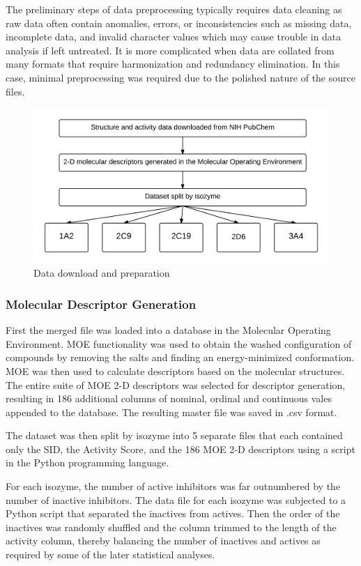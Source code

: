 The preliminary steps of data preprocessing typically requires data cleaning as raw data often contain anomalies, errors, or inconsistencies such as missing data, incomplete data, and invalid character values which may cause trouble in data analysis if left untreated. It is more complicated when data are collated from many formats that require harmonization and redundancy elimination. \cite{Nantasenamat2009} In this case, minimal preprocessing was required due to the polished nature of the source files.


\begin{figure}[h,t]
  \caption{Data download and preparation}
  \centering
   \includegraphics[width=1\textwidth]{../img/Dataset_prep.png}
\end{figure}


\subsubsection{Molecular Descriptor Generation}
First the merged file was loaded into a database in the Molecular Operating Environment. MOE functionality was used to obtain the washed configuration of compounds by removing the salts and finding an energy-minimized conformation. MOE was then used to calculate descriptors based on the molecular structures. The entire suite of MOE 2-D descriptors was selected for descriptor generation, resulting in 186 additional columns of nominal, ordinal and continuous vales appended to the database. The resulting master file was saved in .csv format.

The dataset was then split by isozyme into 5 separate files that each contained only the SID, the Activity Score, and the 186 MOE 2-D descriptors using a script in the Python programming language.

For each isozyme, the number of active inhibitors was far outnumbered by the number of inactive inhibitors. The data file for each isozyme was subjected to a Python script that separated the inactives from actives. Then the order of the inactives was randomly shuffled and the column trimmed to the length of the activity column, thereby balancing the number of inactives and actives as required by some of the later statistical analyses. 

